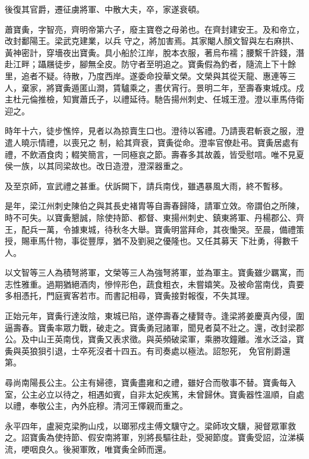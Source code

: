 \begin{pinyinscope}
 後復其官爵，遷征虜將軍、中散大夫，卒，家遂衰頓。



 蕭寶夤，字智亮，齊明帝第六子，廢主寶卷之母弟也。在齊封建安王。及和帝立，改封鄱陽王。梁武克建業，以兵
 守之，將加害焉。其家閹人顏文智與左右麻拱、黃神密計，穿墻夜出寶夤。具小船於江岸，脫本衣服，著烏布襦；腰繫千許錢，潛赴江畔；躡屩徒步，腳無全皮。防守者至明追之。寶夤假為釣者，隨流上下十餘里，追者不疑。待散，乃度西岸。遂委命投華文榮。文榮與其從天龍、惠連等三人，棄家，將寶夤遁匿山澗，賃驢乘之，晝伏宵行。景明二年，至壽春東城戍。戍主杜元倫推檢，知實蕭氏子，以禮延待。馳告揚州刺史、任城王澄。澄以車馬侍衛迎之。



 時年十六，徒步憔悴，見者以為掠賣生口也。澄待以客禮。乃請喪君斬衰之服，澄遣人曉示情禮，以喪兄之
 制，給其齊衰，寶夤從命。澄率官僚赴弔。寶夤居處有禮，不飲酒食肉；輟笑簡言，一同極哀之節。壽春多其故義，皆受慰唁。唯不見夏侯一族，以其同梁故也。改日造澄，澄深器重之。



 及至京師，宣武禮之甚重。伏訴闕下，請兵南伐，雖遇暴風大雨，終不暫移。



 是年，梁江州刺史陳伯之與其長史褚胄等自壽春歸降，請軍立效。帝謂伯之所陳，時不可失。以寶夤懇誠，除使持節、都督、東揚州刺史、鎮東將軍、丹楊郡公、齊王，配兵一萬，令據東城，待秋冬大舉。寶夤明當拜命，其夜慟哭。至晨，備禮策授，賜車馬什物，事從豐厚，猶不及劉昶之優隆也。又任其募天
 下壯勇，得數千人。



 以文智等三人為積弩將軍，文榮等三人為強弩將軍，並為軍主。寶夤雖少羈寓，而志性雅重。過期猶絕酒肉，慘悴形色，蔬食粗衣，未嘗嬉笑。及被命當南伐，貴要多相憑托，門庭賓客若市。而書記相尋，寶夤接對報復，不失其理。



 正始元年，寶夤行達汝陰，東城已陷，遂停壽春之棲賢寺。逢梁將姜慶真內侵，圍逼壽春。寶夤率眾力戰，破走之。寶夤勇冠諸軍，聞見者莫不壯之。還，改封梁郡公。及中山王英南伐，寶夤又表求徵。與英頻破梁軍，乘勝攻鐘離。淮水泛溢，寶夤與英狼狽引退，士卒死沒者十四五。有司奏處以極法。詔恕死，
 免官削爵還第。



 尋尚南陽長公主。公主有婦德，寶夤盡雍和之禮，雖好合而敬事不替。寶夤每入室，公主必立以待之，相遇如賓，自非太妃疾篤，未曾歸休。寶夤器性溫順，自處以禮，奉敬公主，內外庇穆。清河王懌親而重之。



 永平四年，盧昶克梁朐山戍，以瑯邪戍主傅文驥守之。梁師攻文驥，昶督眾軍救之。詔寶夤為使持節、假安南將軍，別將長驅往赴，受昶節度。寶夤受詔，泣涕橫流，哽咽良久。後昶軍敗，唯寶夤全師而還。




\end{pinyinscope}
